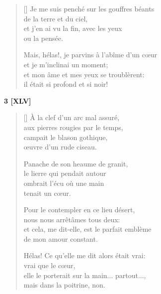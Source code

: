 \documentclass[a4paper,12pt]{book}
\begin{document}
\settowidth{\versewidth}{Mais, hélas!, je parvins à l'abîme d'un cœur}

\begin{verse}[\versewidth]
  Je me suis penché sur les gouffres béants \\
  de la terre et du ciel, \\
  et j'en ai vu la fin, avec les yeux \\
  ou la pensée.

  Mais, hélas!, je parvins à l'abîme d'un cœur \\
  et je m'inclinai un moment; \\
  et mon âme et mes yeux se troublèrent: \\
  il était si profond et si noir!
\end{verse}

\bigskip

\begin{center}
  \textbf{3 [XLV]}
\end{center}

\settowidth{\versewidth}{et cela, me dit-elle, est le parfait emblème}

\begin{verse}[\versewidth]
  À la clef d'un arc mal assuré, \\
  aux pierres rougies par le temps, \\
  campait le blason gothique, \\
  œuvre d'un rude ciseau.

  Panache de son heaume de granit, \\
  le lierre qui pendait autour \\
  ombrait l'écu où une main \\
  tenait un cœur.

  Pour le contempler en ce lieu désert, \\
  nous nous arrêtâmes tous deux: \\
  et cela, me dit-elle, est le parfait emblème \\
  de mon amour constant.

  Hélas! Ce qu'elle me dit alors était vrai: \\
  vrai que le cœur, \\
  elle le porterait sur la main... partout..., \\
  mais dans la poitrine, non.
\end{verse}

\bigskip
\end{document}
